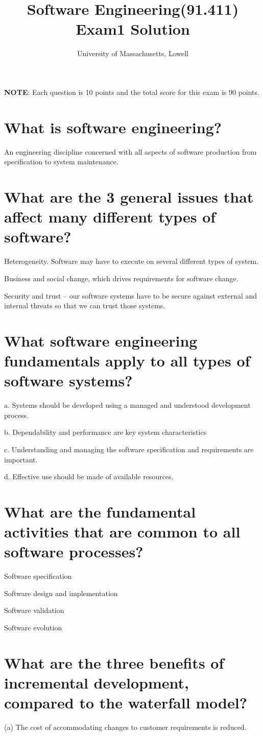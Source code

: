 \documentclass{article}
\author{University of Massachusetts, Lowell}
\title{Software Engineering(91.411) Exam1 Solution}
\begin{document}
\maketitle

\textbf{NOTE}: Each question is 10 points and the total score for this exam is 90 points.


\section{What is software engineering?}
An engineering discipline concerned with all aspects of software production from specification to system maintenance.

\section{What are the 3 general issues that affect many different types of software?}
Heterogeneity. Software may have to execute on several different types of system.

Business and social change, which drives requirements for software change.

Security and trust -- our software systems have to be secure against external and internal threats so that we can trust those systems.

\section{What software engineering fundamentals apply to all types of software systems?}
a. Systems should be developed using a managed and understood development process.

b. Dependability and performance are key system characteristics

c. Understanding and managing the software specification and requirements are important.

d. Effective use should be made of available resources.

\section{What are the fundamental activities that are common to all software processes?}
Software specification

Software design and implementation 

Software validation

Software evolution


\section{What are the three benefits of incremental development, compared to the waterfall model?}
(a) The cost of accommodating changes to customer requirements is reduced.
\end{document}
